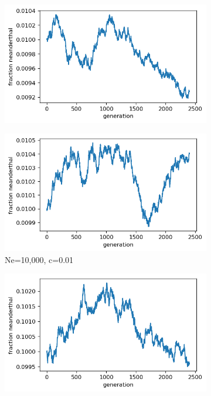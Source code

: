 \documentclass{article}
\begin{document}
\begin{figure}[h]
	\centering
	\begin{subfigure}[t]{0.24\linewidth}
		\centering
		\includegraphics[width = 1.0\linewidth, trim={0 0 0 0}, clip=true]{figures/Ne3400_c01_meann.png}
	\end{subfigure}
	\hspace{0.0\linewidth}
	\begin{subfigure}[t]{0.24\linewidth}
		\centering
		\includegraphics[width = 1.0\linewidth, trim={0 0 0 0}, clip=true]{figures/Ne10000_c01_meann.png}
		\caption{Ne=10,000, c=0.01}
	\end{subfigure}
	\hspace{0.0\linewidth}
	\begin{subfigure}[t]{0.24\linewidth}
		\centering
		\includegraphics[width = 1.0\linewidth, trim={0 0 0 0}, clip=true]{figures/Ne3400_c1_meann.png}

\end{subfigure}
\end{figure}
\end{document}
